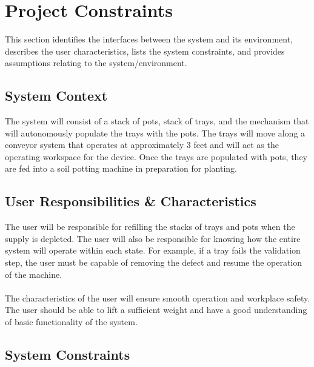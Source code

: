 \documentclass[12pt]{article}
\begin{document}
\section{Project Constraints}

This section identifies the
interfaces between the system and its environment, describes the user
characteristics, lists the system constraints, and provides assumptions relating to the system/environment.

\subsection{System Context}
The system will consist of a stack of pots, stack of trays, and the mechanism that will 
autonomously populate the trays with the pots. The trays will move along a conveyor system that operates at approximately 3 feet 
and will act as the operating workspace for the device. Once the trays are populated with pots,
they are fed into a soil potting machine in preparation for planting.

\subsection{User Responsibilities \& Characteristics}

The user will be responsible for refilling the stacks of trays and pots when the supply is depleted. 
The user will also be responsible for knowing how the entire system will operate within each state. 
For example, if a tray fails the validation step, the user must be capable of removing the defect and resume the operation of the machine.\\\\
\noindent The characteristics of the user will ensure smooth operation and workplace safety. The user should be 
able to lift a sufficient weight and have a good understanding of basic functionality of the system.


\subsection{System Constraints}

\end{document}
